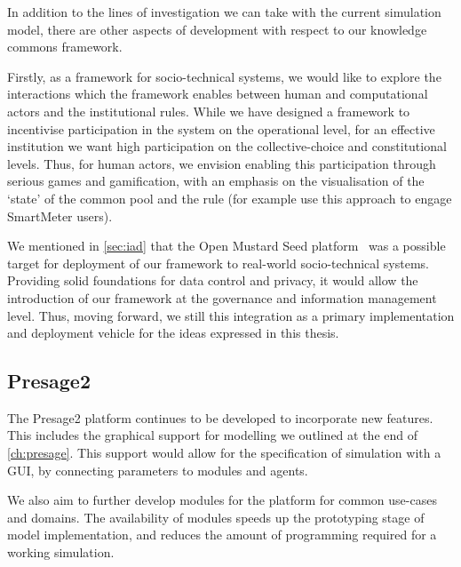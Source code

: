 In addition to the lines of investigation we can take with the current
simulation model, there are other aspects of development with respect to our
knowledge commons framework.

Firstly, as a framework for socio-technical systems, we would like to explore
the interactions which the framework enables between human and computational
actors and the institutional rules. While we have designed a framework to
incentivise participation in the system on the operational level, for an
effective institution we want high participation on the collective-choice and
constitutional levels. Thus, for human actors, we envision enabling this
participation through serious games and gamification, with an emphasis on the
visualisation of the `state' of the common pool and the rule (for example
\citet{Bourazeri12} use this approach to engage SmartMeter users). 

We mentioned in \autoref{sec:iad} that the Open Mustard Seed
platform~\citep{Hardjono2014a} was a possible target for deployment of our
framework to real-world socio-technical systems. Providing solid foundations
for data control and privacy, it would allow the introduction of our framework
at the governance and information management level. Thus, moving forward, we
still this integration as a primary implementation and deployment vehicle for
the ideas expressed in this thesis.


\subsection{Presage2}

The Presage2 platform continues to be developed to incorporate new features.
This includes the graphical support for modelling we outlined at the end of
\autoref{ch:presage}. This support would allow for the specification of
simulation with a \ac{GUI}, by connecting parameters to modules and agents.

We also aim to further develop modules for the platform for common use-cases
and domains. The availability of modules speeds up the prototyping stage of
model implementation, and reduces the amount of programming required for a
working simulation.

